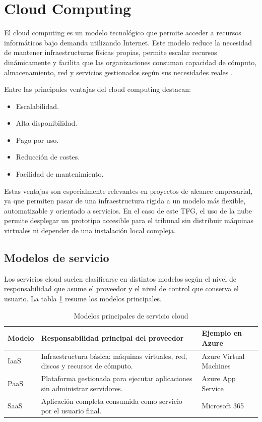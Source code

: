 
\section{Cloud Computing}

El cloud computing es un modelo tecnológico que permite acceder a recursos informáticos bajo demanda utilizando Internet. Este modelo reduce la necesidad de mantener infraestructuras físicas propias, permite escalar recursos dinámicamente y facilita que las organizaciones consuman capacidad de cómputo, almacenamiento, red y servicios gestionados según sus necesidades reales \cite{microsoft_azure}.

Entre las principales ventajas del cloud computing destacan:

\begin{itemize}
    \item Escalabilidad.
    \item Alta disponibilidad.
    \item Pago por uso.
    \item Reducción de costes.
    \item Facilidad de mantenimiento.
\end{itemize}

Estas ventajas son especialmente relevantes en proyectos de alcance empresarial, ya que permiten pasar de una infraestructura rígida a un modelo más flexible, automatizable y orientado a servicios. En el caso de este TFG, el uso de la nube permite desplegar un prototipo accesible para el tribunal sin distribuir máquinas virtuales ni depender de una instalación local compleja.

\subsection{Modelos de servicio}

Los servicios cloud suelen clasificarse en distintos modelos según el nivel de responsabilidad que asume el proveedor y el nivel de control que conserva el usuario. La tabla \ref{tabla:modelos_servicio_cloud} resume los modelos principales.

\begin{table}[h]
\centering
\small
\begin{tabularx}{\textwidth}{l X X}
\textbf{Modelo} & \textbf{Responsabilidad principal del proveedor} & \textbf{Ejemplo en Azure} \\
\hline
IaaS & Infraestructura básica: máquinas virtuales, red, discos y recursos de cómputo. & Azure Virtual Machines \\
PaaS & Plataforma gestionada para ejecutar aplicaciones sin administrar servidores. & Azure App Service \\
SaaS & Aplicación completa consumida como servicio por el usuario final. & Microsoft 365 \\
\end{tabularx}
\caption{Modelos principales de servicio cloud}
\label{tabla:modelos_servicio_cloud}
\end{table}

